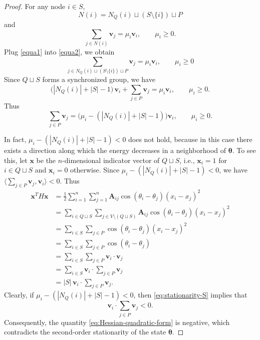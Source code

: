 \documentclass[11pt,reqno]{amsart}
\theoremstyle{definition}
\begin{document}
\begin{proof}
	For any node $i\in S$, \begin{equation}\label{equa1}
		N(i) = N_Q(i) \sqcup (S\setminus\{i\}) \sqcup P 
	\end{equation} and \begin{equation}\label{equa2}\sum_{j\in N(i)} \boldsymbol{v}_j=\mu_i\boldsymbol{v}_i, \qquad \mu_i\geq 0.\end{equation}
	Plug \eqref{equa1} into \eqref{equa2}, we obtain $$\sum_{j\in N_Q(i) \sqcup(S\setminus \{i\})\sqcup P} \boldsymbol{v}_j=\mu_i\boldsymbol{v}_i, \qquad \mu_i\geq 0$$
	Since $Q \sqcup S$ forms a synchronized group, we have
    \begin{equation}\label{eq:stationarity-S}
        \bigl(|N_Q(i)| + |S| - 1\bigr)\,\boldsymbol{v}_i
    + \sum_{j \in P} \boldsymbol{v}_j
    = \mu_i \boldsymbol{v}_i, \qquad \mu_i \ge 0.
    \end{equation}
	Thus \[ \sum_{j\in P} \boldsymbol{v}_j
    = \bigl(\mu_i - (|N_Q(i)| + |S| - 1)\bigr)\boldsymbol{v}_i,
    \qquad \mu_i \ge 0. \]
    
In fact, $\mu_i - (|N_Q(i)| + |S| - 1) < 0$ does not hold, because in this case there exists a direction along which the 
energy decreases in a neighborhood of $\boldsymbol{\theta}$.
To see this, let $\boldsymbol{x}$ be the $n$-dimensional indicator vector 
of $Q \sqcup S$, i.e., $\boldsymbol x_i = 1$ for $i \in Q \sqcup S$ and $\boldsymbol x_i = 0$ otherwise.
Since $\mu_i-(|N_Q(i)|+|S|-1)<0$, we have $\langle \sum_{j\in P}\boldsymbol{v}_j,\boldsymbol{v}_i \rangle < 0$.
Thus \begin{equation}\label{eq:Hessian-quadratic-form}
\begin{aligned}
\boldsymbol{x}^T H \boldsymbol{x}
    &=\frac{1}{2}\sum_{i=1}^n\sum_{j=1}^n \boldsymbol{A}_{ij}\cos(\theta_i-\theta_j)(x_i-x_j)^2\\
    &= \sum_{i \in Q \sqcup S} \sum_{j \in V\setminus (Q \sqcup S)}\boldsymbol{A}_{ij}\cos(\theta_i - \theta_j)(x_i-x_j)^2 \\
    & = \sum_{i \in S} \sum_{j \in P} \cos(\theta_i - \theta_j)(x_i-x_j)^2 \\
    & = \sum_{i \in S} \sum_{j \in P} \cos(\theta_i - \theta_j)\\
    &= \sum_{i \in S} \sum_{j \in P} \boldsymbol{v}_i \cdot \boldsymbol{v}_j \\
    &= \sum_{i \in S} \boldsymbol{v}_i \cdot \sum_{j \in P} \boldsymbol{v}_j \\
    &= |S| \, \boldsymbol{v}_i \cdot \sum_{j \in P} \boldsymbol{v}_j .
\end{aligned}
\end{equation}
Clearly, if $\mu_i - (|N_Q(i)| + |S| - 1) < 0$, then \eqref{eq:stationarity-S} implies that
\[
\boldsymbol{v}_i \cdot \sum_{j\in P} \boldsymbol{v}_j < 0.
\]
Consequently, the quantity \eqref{eq:Hessian-quadratic-form} is negative, which contradicts the second-order stationarity of the state
$\boldsymbol{\theta}$.
\end{proof}
\end{document}
